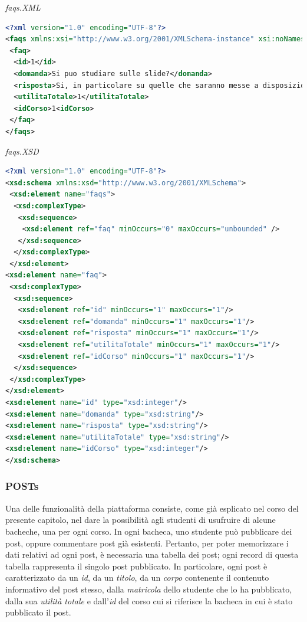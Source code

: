 \documentclass [a4paper,11pt]{book}
\begin{document}
\medskip

\emph{faqs.XML}

\label{sec:faqs}

\begin{lstlisting}[language=XML]
<?xml version="1.0" encoding="UTF-8"?>
<faqs xmlns:xsi="http://www.w3.org/2001/XMLSchema-instance" xsi:noNamespaceSchemaLocation="faqs.xsd">
 <faq>
  <id>1</id>
  <domanda>Si puo studiare sulle slide?</domanda>
  <risposta>Si, in particolare su quelle che saranno messe a disposizione durante il corso</risposta>
  <utilitaTotale>1</utilitaTotale>
  <idCorso>1<idCorso>
 </faq>
</faqs>
\end{lstlisting}

\medskip

\emph{faqs.XSD}

\begin{lstlisting}[language=XML]
<?xml version="1.0" encoding="UTF-8"?>
<xsd:schema xmlns:xsd="http://www.w3.org/2001/XMLSchema">
 <xsd:element name="faqs">
  <xsd:complexType>
   <xsd:sequence>
    <xsd:element ref="faq" minOccurs="0" maxOccurs="unbounded" />
   </xsd:sequence>
  </xsd:complexType>
 </xsd:element>
<xsd:element name="faq">
 <xsd:complexType>
  <xsd:sequence>
   <xsd:element ref="id" minOccurs="1" maxOccurs="1"/>
   <xsd:element ref="domanda" minOccurs="1" maxOccurs="1"/>
   <xsd:element ref="risposta" minOccurs="1" maxOccurs="1"/>
   <xsd:element ref="utilitaTotale" minOccurs="1" maxOccurs="1"/>
   <xsd:element ref="idCorso" minOccurs="1" maxOccurs="1"/>
  </xsd:sequence>
 </xsd:complexType>
</xsd:element>
<xsd:element name="id" type="xsd:integer"/>
<xsd:element name="domanda" type="xsd:string"/>
<xsd:element name="risposta" type="xsd:string"/>
<xsd:element name="utilitaTotale" type="xsd:string"/>
<xsd:element name="idCorso" type="xsd:integer"/>
</xsd:schema>
\end{lstlisting}

\medskip

\subsubsection{POSTs}

Una delle funzionalità della piattaforma consiste, come già esplicato nel corso del presente capitolo, nel dare la possibilità agli studenti di usufruire di alcune bacheche, una per ogni corso. In ogni bacheca, uno studente può pubblicare dei post, oppure commentare post già esistenti. Pertanto, per poter memorizzare i dati relativi ad ogni post, è necessaria una tabella dei post; ogni record di questa tabella rappresenta il singolo post pubblicato. In particolare, ogni post è caratterizzato da un \emph{id}, da un \emph{titolo}, da un \emph{corpo} contenente il contenuto informativo del post stesso, dalla \emph{matricola} dello studente che lo ha pubblicato, dalla sua \emph{utilità totale} e dall'\emph{id} del corso cui si riferisce la bacheca in cui è stato pubblicato il post.
\end{document}
